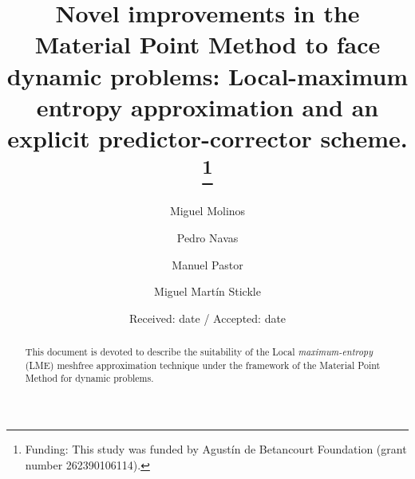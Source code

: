 %

\newcommand{\Matrix}[1]{
  \ensuremath{\mathbf{{#1}}}
}
\newcommand{\Vector}[1]{
  \ensuremath{\mathbf{{#1}}}
}

\newcommand{\Div}[1]{
  \ensuremath{div({#1})}
}
\newcommand\Grad[1]{grad({#1})}
\newcommand\GradS[1]{grad^s({#1})}
\newcommand\GradT[1]{grad^T({#1})}


\newcommand{\Deriv}[3][]{
  \ensuremath{\frac{\partial^{#1}{#2}}{ \partial {#3}^{#1} }}
}

\newcommand{\Integral}[2]{
  \IfStrEqCase{#1}{
    {2}{\ensuremath{\int_{\varGamma_d}{#2}\ d\varGamma}}
    {3}{\ensuremath{\int_{\varOmega}{#2}\ d\varOmega}}
  }
}

%
%


\title{Novel improvements in the Material Point Method to face
  dynamic problems: 
  Local-maximum entropy approximation and an explicit   predictor-corrector scheme. \thanks{Funding: This
    study was funded by Agustín de Betancourt Foundation (grant number
    262390106114).}
}


\author{Miguel Molinos \and
  Pedro Navas \and
  Manuel Pastor \and
  Miguel Martín Stickle
}




\date{Received: date / Accepted: date}

\maketitle
\begin{abstract}
  This document is devoted to describe the suitability of the Local
  \textit{maximum-entropy} (LME) meshfree approximation technique under the framework of the
  Material Point Method for dynamic problems. 
\end{abstract}

